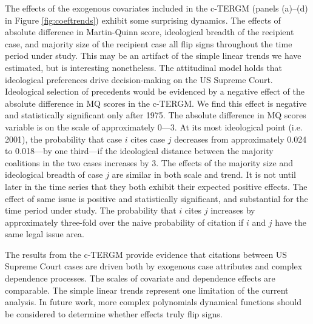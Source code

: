 \documentclass[headsepline=true, abstracton]{scrartcl}
\begin{document}
The effects of the exogenous covariates included in the c-TERGM (panels (a)--(d) in Figure \ref{fig:coeftrends}) exhibit some surprising dynamics. The effects of absolute difference in Martin-Quinn score, ideological breadth of the recipient case, and majority size of the recipient case all flip signs throughout the time period under study. This may be an artifact of the simple linear trends we have estimated, but is interesting nonetheless. The attitudinal model holds that ideological preferences drive decision-making on the US Supreme Court. Ideological selection of precedents would be evidenced by a negative effect of the absolute difference in MQ scores in the c-TERGM. We find this effect is negative and statistically significant only after 1975. The absolute difference in MQ scores variable is on the scale of approximately 0---3. At its most ideological point (i.e. 2001), the probability that case $i$ cites case $j$ decreases from approximately 0.024 to 0.018---by one third---if the ideological distance between the majority coalitions in the two cases increases by 3. The effects of the majority size and ideological breadth of case $j$ are similar in both scale and trend. It is not until later in the time series that they both exhibit their expected positive effects. The effect of same issue is positive and statistically significant, and substantial for the time period under study. The probability that $i$ cites $j$ increases by approximately three-fold over the naive probability of citation if $i$ and $j$ have the same legal issue area.

The results from the c-TERGM provide evidence that citations between US Supreme Court cases are driven both by exogenous case attributes and complex dependence processes. The scales of covariate and dependence effects are comparable. The simple linear trends represent one limitation of the current analysis. In future work, more complex polynomials dynamical functions should be considered to determine whether effects truly flip signs.
\end{document}
